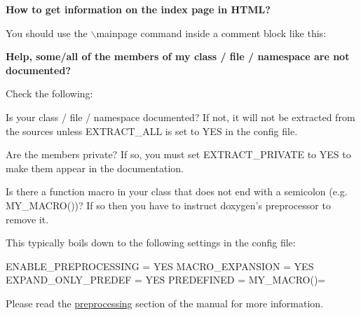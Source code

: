
\begin{DoxyEnumerate}
\item {\bfseries How to get information on the index page in HTML?} 

You should use the $\backslash$mainpage command inside a comment block like this: 



\item {\bfseries Help, some/all of the members of my class / file / namespace are not documented?}

Check the following: 
\begin{DoxyEnumerate}
\item Is your class / file / namespace documented? If not, it will not be extracted from the sources unless {\ttfamily EXTRACT\_\-ALL} is set to {\ttfamily YES} in the config file. 
\item Are the members private? If so, you must set {\ttfamily EXTRACT\_\-PRIVATE} to {\ttfamily YES} to make them appear in the documentation. 
\item Is there a function macro in your class that does not end with a semicolon (e.g. MY\_\-MACRO())? If so then you have to instruct doxygen's preprocessor to remove it.

This typically boils down to the following settings in the config file:

\begin{DoxyVerb}
ENABLE_PREPROCESSING   = YES
MACRO_EXPANSION        = YES
EXPAND_ONLY_PREDEF     = YES
PREDEFINED             = MY_MACRO()=
      \end{DoxyVerb}


Please read the \hyperlink{preprocessing}{preprocessing} section of the manual for more information. 
\end{DoxyEnumerate}



\end{DoxyEnumerate}

